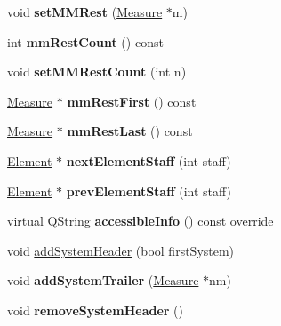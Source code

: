 \begin{DoxyCompactItemize}
void {\bfseries set\+M\+M\+Rest} (\hyperlink{class_ms_1_1_measure}{Measure} $\ast$m)
\item 
\mbox{\label{class_ms_1_1_measure_a4bc97255a366ad792cc65094767152c5}} 
int {\bfseries mm\+Rest\+Count} () const
\item 
\mbox{\label{class_ms_1_1_measure_a405ecf7ac85a17e4285644b04a8085d0}} 
void {\bfseries set\+M\+M\+Rest\+Count} (int n)
\item 
\mbox{\label{class_ms_1_1_measure_a5228137f2805b40984b458c21f28b2a6}} 
\hyperlink{class_ms_1_1_measure}{Measure} $\ast$ {\bfseries mm\+Rest\+First} () const
\item 
\mbox{\label{class_ms_1_1_measure_a6ba907c7751b675b51ea2a192ace5699}} 
\hyperlink{class_ms_1_1_measure}{Measure} $\ast$ {\bfseries mm\+Rest\+Last} () const
\item 
\mbox{\label{class_ms_1_1_measure_a8869603560feec9fc5043a5504dd2ebd}} 
\hyperlink{class_ms_1_1_element}{Element} $\ast$ {\bfseries next\+Element\+Staff} (int staff)
\item 
\mbox{\label{class_ms_1_1_measure_a9f4f3f0ab29df1324b31196c56ff6ab0}} 
\hyperlink{class_ms_1_1_element}{Element} $\ast$ {\bfseries prev\+Element\+Staff} (int staff)
\item 
\mbox{\label{class_ms_1_1_measure_a9b3cd3c2da92d5a0799962cf3c13b09d}} 
virtual Q\+String {\bfseries accessible\+Info} () const override
\item 
void \hyperlink{class_ms_1_1_measure_ac7e0eb9cc9bfb9d619f2cb52ba6f2ea8}{add\+System\+Header} (bool first\+System)
\item 
\mbox{\label{class_ms_1_1_measure_a260e48485af749a75d5e763700e13010}} 
void {\bfseries add\+System\+Trailer} (\hyperlink{class_ms_1_1_measure}{Measure} $\ast$nm)
\item 
\mbox{\label{class_ms_1_1_measure_a90caa02f9c7dfbb0b6f8e96134c29257}} 
void {\bfseries remove\+System\+Header} ()
\item 

\end{DoxyCompactItemize}
